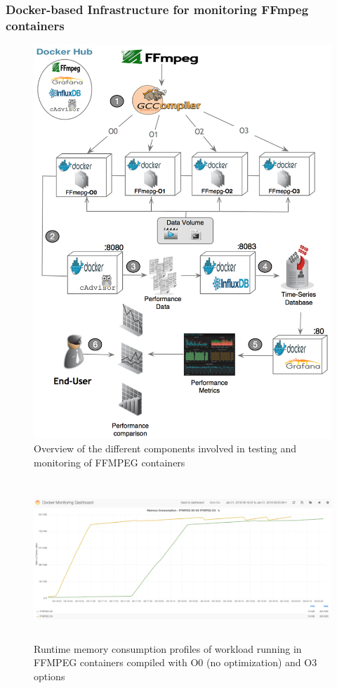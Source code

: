 \subsubsection{Docker-based Infrastructure for monitoring FFmpeg containers}
\begin{figure}[h]
	\centering
	\includegraphics[scale=0.40]{Ressources/infra_ffmpeg.png}
	\caption{Overview of the different components involved in testing and monitoring of FFMPEG containers}
\end{figure}
\begin{figure}
	
	\center
	
	\includegraphics[width=15cm,height=6cm]{Ressources/infra_stats.png}
	\caption{Runtime memory consumption profiles of workload running in FFMPEG containers compiled with O0 (no optimization) and O3 options}
	
	\label{AAA}
	
\end{figure}
